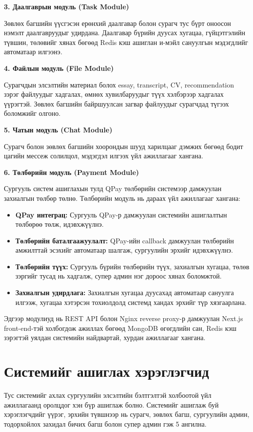 \textbf{3. Даалгаврын модуль (Task Module)}

Зөвлөх багшийн үүсгэсэн ерөнхий даалгавар болон сурагч тус бүрт оноосон нэмэлт даалгавруудыг удирдана. Даалгавар бүрийн дуусах хугацаа, гүйцэтгэлийн түвшин, төлөвийг хянах бөгөөд Redis кэш ашиглан и-мэйл сануулгын мэдэгдлийг автоматаар илгээнэ.

\textbf{4. Файлын модуль (File Module)}

Сурагчдын элсэлтийн материал болох essay, transcript, CV, recommendation зэрэг файлуудыг хадгалах, өмнөх хувилбаруудыг түүх хэлбэрээр хадгалах үүрэгтэй. Зөвлөх багшийн байршуулсан загвар файлуудыг сурагчдад түгээх боломжийг олгоно.

\textbf{5. Чатын модуль (Chat Module)}

Сурагч болон зөвлөх багшийн хоорондын шууд харилцааг дэмжих бөгөөд бодит цагийн мессеж солилцол, мэдэгдэл илгээх үйл ажиллагааг хангана.

\textbf{6. Төлбөрийн модуль (Payment Module)}

Сургууль систем ашиглахын тулд QPay төлбөрийн системээр дамжуулан захиалгын төлбөр төлнө. Төлбөрийн модуль нь дараах үйл ажиллагааг хангана:

\begin{itemize}
    \item \textbf{QPay интеграц:} Сургууль QPay-р дамжуулан системийн ашиглалтын төлбөрөө төлж, идэвхжүүлнэ.
    \item \textbf{Төлбөрийн баталгаажуулалт:} QPay-ийн callback дамжуулан төлбөрийн амжилттай эсэхийг автоматаар шалгаж, сургуулийн эрхийг идэвхжүүлнэ.
    \item \textbf{Төлбөрийн түүх:} Сургууль бүрийн төлбөрийн түүх, захиалгын хугацаа, төлөв зэргийг тусад нь хадгалж, супер админ нэг дороос хянах боломжтой.
    \item \textbf{Захиалгын удирдлага:} Захиалгын хугацаа дуусахад автоматаар сануулга илгээж, хугацаа хэтэрсэн тохиолдолд системд хандах эрхийг түр хязгаарлана.
\end{itemize}

Эдгээр модулиуд нь REST API болон Nginx reverse proxy-р дамжуулан Next.js front-end-тэй холбогдож ажиллах бөгөөд MongoDB өгөгдлийн сан, Redis кэш зэрэгтэй уялдан системийн найдвартай, хурдан ажиллагааг хангана.

\section{Системийг ашиглах хэрэглэгчид}
\paragraph{}Тус системийг ахлах сургуулийн элсэлтийн бэлтгэлтэй холбоотой үйл ажиллагаанд оролцдог хэн бүр ашиглаж болно. Системийг ашиглаж буй хэрэглэгчдийг үүрэг, эрхийн түвшнээр нь сурагч, зөвлөх багш, сургуулийн админ, тодорхойлох захидал бичих багш болон супер админ гэж 5 ангилна.

